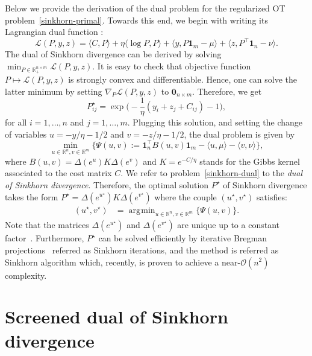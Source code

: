 \documentclass{article}
\newcommand{\bigO}{\mathcal{O}}
\newcommand{\inr}[1]{\langle #1 \rangle}
\newcommand{\R}{{\mathbb{R}}}
\DeclareMathOperator*{\argmin}{\arg\!\min}
\begin{document}
Below we provide the derivation of the dual problem for the regularized OT problem~\eqref{sinkhorn-primal}. Towards this end, we begin with writing its Lagrangian dual function :
\begin{equation*}
  \mathscr{L}(P,y, z) = \inr{C,P} + \eta \inr{\log P, P} + \inr{y, P\mathbf{1}_m - \mu} + \inr{z,P^\top \mathbf{1}_n - \nu}.
\end{equation*}
The dual of Sinkhorn divergence can be derived by solving $\min_{P \in \R_+^{n\times m}}\mathscr{L}(P,y, z)$. It is easy to check that objective function $P\mapsto \mathscr{L}(P,y, z)$ is strongly convex and differentiable. Hence, one can solve the latter minimum by setting $\nabla_P \mathscr{L}(P,y, z)$ to $\mathbf{0}_{n\times m}$. Therefore, we get 
\begin{equation}
  P^\star_{ij} = \exp\Big(- \frac{1}{\eta} (y_i + z_j + C_{ij}) - 1\Big), 
\end{equation}
for all $i=1, \ldots, n$ and $j=1, \ldots, m$. Plugging this solution,  and setting the change of variables $u = -y/\eta - 1/2$ and $v = - z/\eta - 1/2$, the dual problem is given by
\begin{equation}
\label{sinkhorn-dual}
\min_{u \in \R^n, v\in\R^m}\big\{\Psi(u,v):= \mathbf{1}_n^\top B(u,v)\mathbf{1}_m - \inr{u, \mu} - \inr{v, \nu} \big\},
\end{equation}
where $B(u,v) = \Delta(e^{u}) K \Delta(e^{v})$ and $K = e^{-C/\eta}$ stands for the Gibbs kernel associated to the cost matrix $C$. 
We refer to problem~\eqref{sinkhorn-dual} to the \emph{dual of Sinkhorn divergence}.
Therefore, the optimal solution $P^\star$ of Sinkhorn divergence takes the form $P^\star = \Delta(e^{u^\star}) K \Delta(e^{v^\star})$
where the couple $(u^\star, v^\star)$ satisfies:
\begin{align*}
\label{sinkhorn-dual}
  (u^\star, v^\star) &= \argmin_{u \in \R^{n}, v\in \R^m} \{\Psi(u,v)\}.
\end{align*}
Note that the matrices $\Delta(e^{u^\star})$ and $\Delta(e^{v^\star})$ are unique up to a constant factor~\citep{sinkhorn1967}. Furthermore, $P^\star$ can be solved efficiently by iterative Bregman projections~\cite{benamou2015IterativeBP} referred as Sinkhorn iterations, and the method is referred as Sinkhorn algorithm which, recently, is proven to achieve a near-$\bigO(n^2)$ complexity.

\section{Screened dual of Sinkhorn divergence}
\label{sec:screenkhorn}
\end{document}
